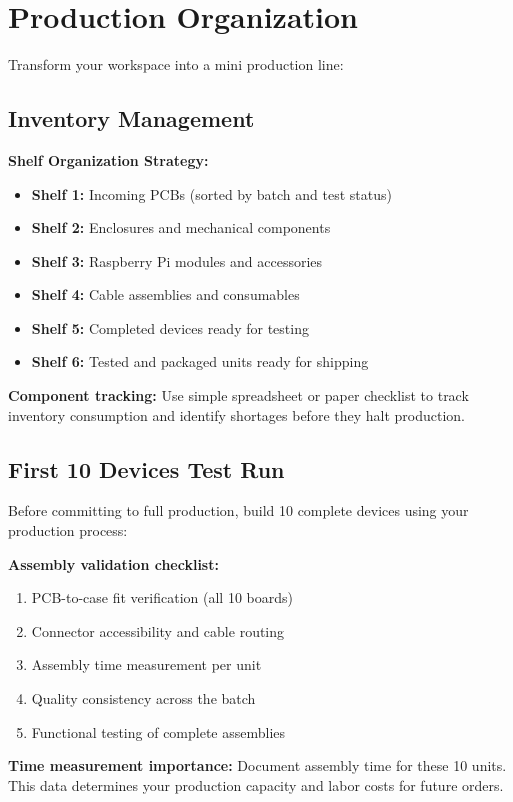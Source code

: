 \section{Production Organization}

Transform your workspace into a mini production line:

\subsection{Inventory Management}

\textbf{Shelf Organization Strategy:}
\begin{itemize}
\item \textbf{Shelf 1:} Incoming PCBs (sorted by batch and test status)
\item \textbf{Shelf 2:} Enclosures and mechanical components
\item \textbf{Shelf 3:} Raspberry Pi modules and accessories
\item \textbf{Shelf 4:} Cable assemblies and consumables
\item \textbf{Shelf 5:} Completed devices ready for testing
\item \textbf{Shelf 6:} Tested and packaged units ready for shipping
\end{itemize}

\textbf{Component tracking:} Use simple spreadsheet or paper checklist to track inventory consumption and identify shortages before they halt production.

\subsection{First 10 Devices Test Run}

Before committing to full production, build 10 complete devices using your production process:

\textbf{Assembly validation checklist:}
\begin{enumerate}
\item PCB-to-case fit verification (all 10 boards)
\item Connector accessibility and cable routing
\item Assembly time measurement per unit
\item Quality consistency across the batch
\item Functional testing of complete assemblies
\end{enumerate}

\textbf{Time measurement importance:} Document assembly time for these 10 units. This data determines your production capacity and labor costs for future orders.

